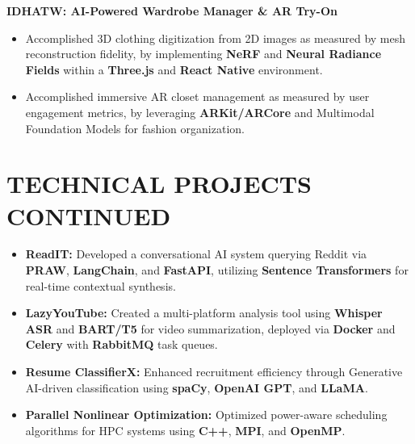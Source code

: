 \documentclass[10pt, a4paper]{article}
\begin{document}
\vspace{4pt}
\textbf{IDHATW: AI-Powered Wardrobe Manager \& AR Try-On}
\begin{itemize}
    \item Accomplished 3D clothing digitization from 2D images as measured by mesh reconstruction fidelity, by implementing \textbf{NeRF} and \textbf{Neural Radiance Fields} within a \textbf{Three.js} and \textbf{React Native} environment.
    \item Accomplished immersive AR closet management as measured by user engagement metrics, by leveraging \textbf{ARKit/ARCore} and Multimodal Foundation Models for fashion organization.
\end{itemize}

\section{TECHNICAL PROJECTS CONTINUED}
\begin{itemize}
    \item \textbf{ReadIT:} Developed a conversational AI system querying Reddit via \textbf{PRAW}, \textbf{LangChain}, and \textbf{FastAPI}, utilizing \textbf{Sentence Transformers} for real-time contextual synthesis.
    \item \textbf{LazyYouTube:} Created a multi-platform analysis tool using \textbf{Whisper ASR} and \textbf{BART/T5} for video summarization, deployed via \textbf{Docker} and \textbf{Celery} with \textbf{RabbitMQ} task queues.
    \item \textbf{Resume ClassifierX:} Enhanced recruitment efficiency through Generative AI-driven classification using \textbf{spaCy}, \textbf{OpenAI GPT}, and \textbf{LLaMA}.
    \item \textbf{Parallel Nonlinear Optimization:} Optimized power-aware scheduling algorithms for HPC systems using \textbf{C++}, \textbf{MPI}, and \textbf{OpenMP}.
\end{itemize}

\end{document}
